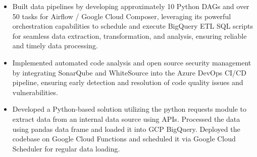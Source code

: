 \documentclass[10pt,a4paper,ragged2e]{altacv}
\begin{document}

\begin{fullwidth}
\makecvheader
\end{fullwidth}



\smallskip
{}
\begin{itemize}
\item Built data pipelines by developing approximately 10 Python DAGs and over 50 tasks for Airflow / Google Cloud Composer, leveraging its powerful orchestration capabilities to schedule and execute BigQuery ETL SQL scripts for seamless data extraction, transformation, and analysis, ensuring reliable and timely data processing.
\item Implemented automated code analysis and open source security management by integrating SonarQube and WhiteSource into the Azure DevOps CI/CD pipeline, ensuring early detection and resolution of code quality issues and vulnerabilities.
\item Developed a Python-based solution utilizing the python requests module to extract data from an internal data source using APIs. Processed the data using pandas data frame and loaded it into GCP BigQuery. Deployed the codebase on Google Cloud Functions and scheduled it via Google Cloud Scheduler for regular data loading.
\smallskip
\end{itemize}
\end{document}
